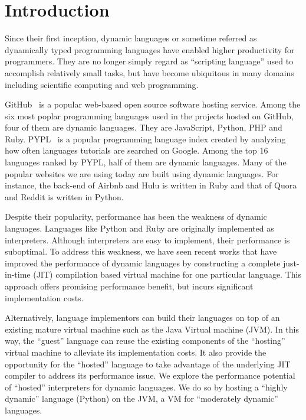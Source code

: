 \chapter{Introduction}
\label{chp:ch1-intro}

Since their first inception, dynamic languages or sometime referred as dynamically typed programming languages have enabled higher productivity for programmers.
They are no longer simply regard as ``scripting language'' used to accomplish relatively small tasks,
but have become ubiquitous in many domains including scientific computing and web programming.

GitHub~\cite{github} is a popular web-based open source software hosting service.
Among the six most poplar programming languages used in the projects hosted on GitHub, four of them are dynamic languages.
They are JavaScript, Python, PHP and Ruby.
PYPL~\cite{pypl} is a popular programming language index created by analyzing how often languages tutorials are searched on Google.
Among the top 16 languages ranked by PYPL, half of them are dynamic languages.
Many of the popular websites we are using today are built using dynamic languages.
For instance, the back-end of Airbnb and Hulu is written in Ruby and that of Quora and Reddit is written in Python.

Despite their popularity, performance has been the weakness of dynamic languages.
Languages like Python and Ruby are originally implemented as interpreters.
Although interpreters are easy to implement, their performance is suboptimal.
To address this weakness, we have seen recent works that have improved the performance of dynamic languages
by constructing a complete just-in-time (JIT) compilation based virtual machine for one particular language.
This approach offers promising performance benefit, but incurs significant implementation costs.

Alternatively, language implementors can build their languages on top of an existing mature virtual machine such as the Java Virtual machine (JVM).
In this way, the ``guest'' language can reuse the existing components of the ``hosting'' virtual machine to alleviate its implementation costs.
It also provide the opportunity for the ``hosted'' language to take advantage of the underlying JIT compiler to address its performance issue.
We explore the performance potential of ``hosted'' interpreters for dynamic languages.
We do so by hosting a ``highly dynamic'' language (Python) on the JVM, a VM for ``moderately dynamic'' languages.

